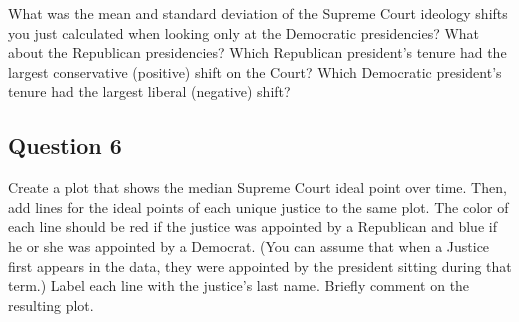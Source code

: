 \documentclass[]{article}
\begin{document}
What was the mean and standard deviation of the Supreme Court ideology
shifts you just calculated when looking only at the Democratic
presidencies? What about the Republican presidencies? Which Republican
president's tenure had the largest conservative (positive) shift on the
Court? Which Democratic president's tenure had the largest liberal
(negative) shift?

\subsection{Question 6}\label{question-6}

Create a plot that shows the median Supreme Court ideal point over time.
Then, add lines for the ideal points of each unique justice to the same
plot. The color of each line should be red if the justice was appointed
by a Republican and blue if he or she was appointed by a Democrat. (You
can assume that when a Justice first appears in the data, they were
appointed by the president sitting during that term.) Label each line
with the justice's last name. Briefly comment on the resulting plot.
\end{document}
